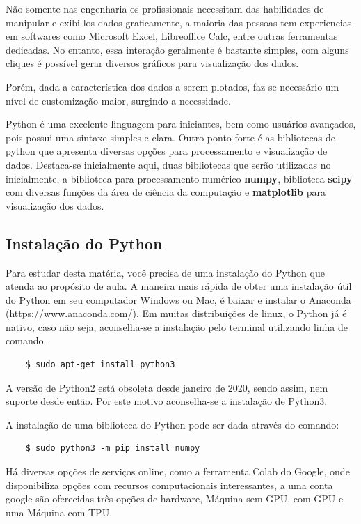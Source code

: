 Não somente nas engenharia os profissionais necessitam das habilidades de manipular e exibi-los dados graficamente,
a maioria das pessoas tem experiencias em softwares como Microsoft Excel, Libreoffice Calc, entre outras ferramentas dedicadas.
No entanto, essa interação geralmente é bastante simples, com alguns cliques é possível gerar diversos gráficos para visualização dos dados.

Porém, dada a característica dos dados a serem plotados, faz-se necessário um nível de customização maior, surgindo a necessidade.

Python é uma excelente linguagem para iniciantes, bem como usuários avançados, pois possui uma sintaxe simples e clara. Outro ponto
forte é as bibliotecas de python que apresenta diversas opções para processamento e visualização de dados. Destaca-se inicialmente aqui, duas
bibliotecas que serão utilizadas no inicialmente, a biblioteca para processamento numérico \textbf{numpy}, biblioteca \textbf{scipy} com diversas
funções da área de ciência da computação e \textbf{matplotlib} para visualização dos dados.
\subsection{Instalação do Python}

Para estudar desta matéria, você precisa de uma instalação do Python que atenda ao propósito de aula. A maneira mais rápida de obter uma instalação útil do Python em seu computador Windows ou Mac,
é baixar e instalar o Anaconda (https://www.anaconda.com/). Em muitas distribuições de linux, o Python já é nativo,
caso não seja, aconselha-se a instalação pelo terminal utilizando linha de comando.

\begin{lstlisting}
    $ sudo apt-get install python3
\end{lstlisting}

A versão de Python2 está obsoleta desde janeiro de 2020, sendo assim, nem suporte desde então. Por este motivo aconselha-se
a instalação de Python3.

A instalação de uma biblioteca do Python pode ser dada através do comando:
\begin{lstlisting}
    $ sudo python3 -m pip install numpy
\end{lstlisting}

Há diversas opções de serviços online, como a ferramenta Colab do Google, onde disponibiliza opções com recursos computacionais interessantes,
a uma conta google são oferecidas três opções de hardware, Máquina sem GPU, com GPU e uma Máquina com TPU.

